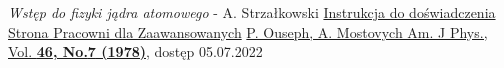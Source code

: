 \documentclass[12pt,a4paper]{article}
\begin{document}
\begin{thebibliography}{}
    \textit{Wstęp do fizyki jądra atomowego} - A. Strzałkowski
    \href{https://www.fuw.edu.pl/IIPRACOWNIA/home/Opisy-cwiczen/J14_2018.pdf}{Instrukcja do doświadczenia}
    \href{https://www.fuw.edu.pl/IIPRACOWNIA/home/}{Strona Pracowni dla Zaawansowanych}
    \href{https://www.fuw.edu.pl/IIPRACOWNIA/home/Opisy-cwiczen/J14_2015.09.16_publikacja.pdf}{P. Ouseph, A. Mostovych Am. J Phys., Vol. \bf{46}, No.\bf{7} (1978)}, dostęp 05.07.2022
    
    
    
\end{thebibliography}
\end{document}
